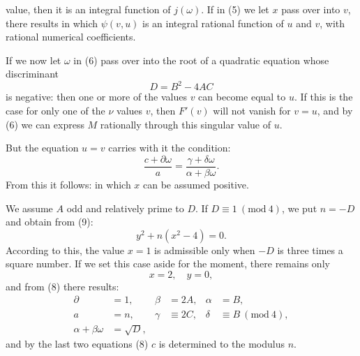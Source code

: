 value, then it is an integral function of $j(\omega)$. If in (5)
we let $x$ pass over into $v$, there results
in which $\psi(v,u)$ is an integral rational function of $u$ and
$v$, with rational numerical coefficients.

If we now let $\omega$ in (6) pass over into the root of a
quadratic equation whose discriminant
\[
D = B^2 - 4AC
\]
is negative:
then one or more of the values $v$ can become equal to $u$. If
this is the case for only one of the $\nu$ values $v$, then $F'(v)$
will not vanish for $v = u$, and by (6) we can express $M$
rationally through this singular value of $u$.

But the equation $u = v$ carries with it the condition:
\[
\frac{c+\partial\omega}{a} = \frac{\gamma+\delta\omega}{\alpha+\beta\omega}.
\]
From this it follows:
in which $x$ can be assumed positive.

We assume $A$ odd and relatively prime to $D$. If
$D \equiv 1\ (\mathrm{mod}\ 4)$, we put $n = -D$ and obtain from (9):
\[
y^2 + n(x^2-4) = 0.
\]
According to this, the value $x=1$ is admissible only when $-D$
is three times a square number. If we set this case aside for
the moment, there remains only
\[
x = 2, \quad y = 0,
\]
and from (8) there results:
\[
\begin{aligned}
\partial &= 1, & \beta &= 2A, & \alpha &= B,\\
a &= n, & \gamma &\equiv 2C, & \delta &\equiv B\ (\mathrm{mod}\ 4),\\
\alpha + \beta\omega &= \sqrt{D}, &&&&
\end{aligned}
\]
and by the last two equations (8) $c$ is determined to the
modulus $n$.
